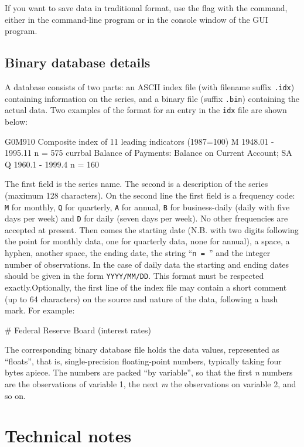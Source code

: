 If you want to save data in traditional format, use the  flag
with the  command, either in the command-line program or in
the console window of the GUI program.

\section{Binary database details}
\label{dbdetails}

A  database consists of two parts: an ASCII index file
(with filename suffix \verb+.idx+) containing information on the
series, and a binary file (suffix \verb+.bin+) containing the actual
data.  Two examples of the format for an entry in the \verb+idx+ file
are shown below:
\begin{code}
      G0M910  Composite index of 11 leading indicators (1987=100) 
      M 1948.01 - 1995.11  n = 575
      currbal Balance of Payments: Balance on Current Account; SA 
      Q 1960.1 - 1999.4 n = 160
\end{code}
The first field is the series name.  The second is a description of
the series (maximum 128 characters).  On the second line the first
field is a frequency code: \verb+M+ for monthly, \verb+Q+ for
quarterly, \verb+A+ for annual, \verb+B+ for business-daily (daily
with five days per week) and \verb+D+ for daily (seven days per week).
No other frequencies are accepted at present.  Then comes the starting
date (N.B. with two digits following the point for monthly data, one
for quarterly data, none for annual), a space, a hyphen, another
space, the ending date, the string ``\verb+n = +'' and the integer
number of observations. In the case of daily data the starting and
ending dates should be given in the form \verb+YYYY/MM/DD+. This
format must be respected exactly.Optionally, the first line of the
index file may contain a short comment (up to 64 characters) on the
source and nature of the data, following a hash mark.  For example:
\begin{code}
      # Federal Reserve Board (interest rates)
\end{code}
The corresponding binary database file holds the data values,
represented as ``floats'', that is, single-precision floating-point
numbers, typically taking four bytes apiece.  The numbers are packed
``by variable'', so that the first \emph{n} numbers are the
observations of variable 1, the next \emph{m} the observations on
variable 2, and so on.

\chapter{Technical notes}
\label{app-technote}

